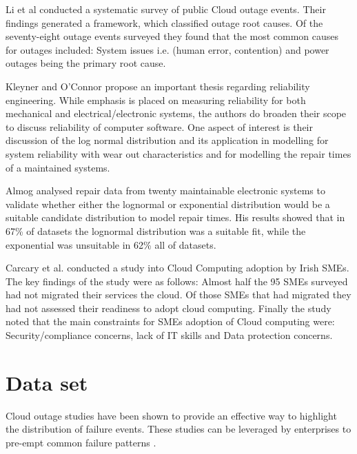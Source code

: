 \documentclass[conference]{IEEEtran}
\begin{document}
Li et al \cite{li2013cloud} conducted a systematic survey of public Cloud outage events. Their findings generated a  framework, which classified outage root causes. Of the seventy-eight outage events surveyed they found that the most common causes for outages included: System issues i.e. (human error, contention) and power outages being the primary root cause. \par

Kleyner and O'Connor \cite{o2011practical} propose an important thesis regarding reliability engineering. While emphasis is placed on measuring reliability for both mechanical and electrical/electronic systems, the authors do broaden their scope to discuss reliability of computer software. One aspect of interest is their discussion of the log normal distribution and its application in modelling for system reliability with wear out characteristics and for modelling the repair times of a maintained systems. \par

Almog \cite{almog1979study} analysed repair data from twenty maintainable electronic systems to validate whether either the lognormal or exponential distribution would be a suitable candidate distribution to model repair times. His results showed that in 67\% of datasets the lognormal distribution was a suitable fit, while the exponential was unsuitable in 62\% all of datasets. \par

Carcary et al. \cite{carcary2014adoption} conducted a study into Cloud Computing adoption by Irish SMEs. The key findings of the study were as follows: Almost half the 95 SMEs surveyed had not migrated their services the cloud. Of those SMEs that had migrated they had not assessed their readiness to adopt cloud computing. Finally the study noted that the main constraints for SMEs adoption of  Cloud computing were: Security/compliance concerns, lack of IT skills and Data protection concerns. \par

\section{Data set}

Cloud outage studies have been shown to provide an effective way to highlight the distribution of failure events. These studies can be leveraged by enterprises to pre-empt common failure patterns \cite{InfoWorld2015outage} \cite{CRN2015outage}. \par
\end{document}
